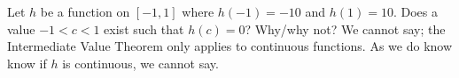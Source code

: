 {Let $h$ be a function on $[-1,1]$ where $h(-1) = -10$ and $h(1) = 10$. Does a value $-1<c<1$ exist such that $h(c) = 0$? Why/why not?
}
{We cannot say; the Intermediate Value Theorem only applies to continuous functions. As we do know know if $h$ is continuous, we cannot say.
}
